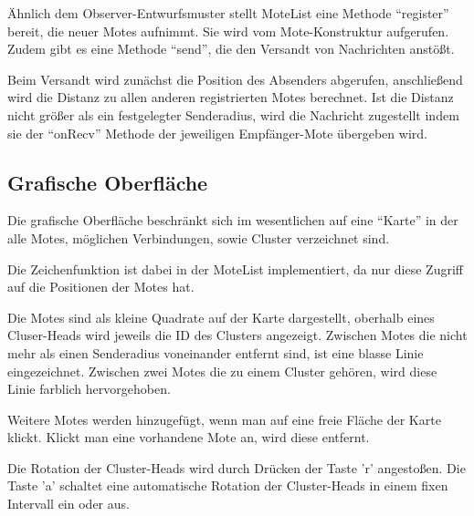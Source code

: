 Ähnlich dem Observer-Entwurfsmuster stellt MoteList eine Methode
``register'' bereit, die neuer Motes aufnimmt. Sie wird vom
Mote-Konstruktur aufgerufen. Zudem gibt es eine Methode ``send'', die
den Versandt von Nachrichten anstößt.

Beim Versandt wird zunächst die Position des Absenders abgerufen,
anschließend wird die Distanz zu allen anderen registrierten Motes
berechnet. Ist die Distanz nicht größer als ein festgelegter
Senderadius, wird die Nachricht zugestellt indem sie der ``onRecv''
Methode der jeweiligen Empfänger-Mote übergeben wird.

\subsection{Grafische Oberfläche}

Die grafische Oberfläche beschränkt sich im wesentlichen auf eine
``Karte'' in der alle Motes, möglichen Verbindungen, sowie Cluster
verzeichnet sind.

Die Zeichenfunktion ist dabei in der MoteList implementiert, da nur
diese Zugriff auf die Positionen der Motes hat.

Die Motes sind als kleine Quadrate auf der Karte dargestellt, oberhalb
eines Cluser-Heads wird jeweils die ID des Clusters angezeigt. Zwischen
Motes die nicht mehr als einen Senderadius voneinander entfernt sind,
ist eine blasse Linie eingezeichnet. Zwischen zwei Motes die zu einem
Cluster gehören, wird diese Linie farblich hervorgehoben.

Weitere Motes werden hinzugefügt, wenn man auf eine freie Fläche der
Karte klickt. Klickt man eine vorhandene Mote an, wird diese entfernt.

Die Rotation der Cluster-Heads wird durch Drücken der Taste 'r'
angestoßen. Die Taste 'a' schaltet eine automatische Rotation der
Cluster-Heads in einem fixen Intervall ein oder aus.
